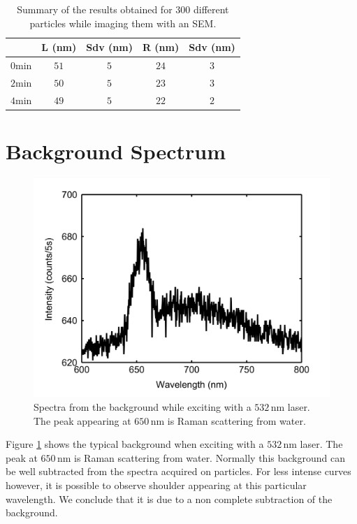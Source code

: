 \documentclass[a4paper,oneside,onecolumn]{article}
\newcommand{\nm}{\ensuremath{\,\textrm{nm}}}
\begin{document}
\begin{table}[htp]
\begin{tabular*}{0.48\textwidth}{c c c c c}
 $\,$ & L (nm) & Sdv (nm) & R (nm) & Sdv (nm) \\\hline
 $0\textrm{min}$ & $51$ & $5$ & $24$ & $3$ \\ 
 $2\textrm{min}$ & $50$ & $5$ & $23$ & $3$ \\
 $4\textrm{min}$ & $49$ & $5$ & $22$ & $2$ \\
\end{tabular*}
\label{tab:SEM_results}
\caption{Summary of the results obtained for 300 different particles while
imaging them with an SEM.}
\end{table}

\section{Background Spectrum}
\begin{figure}[tp]
 \centering
 \includegraphics[width=0.95\linewidth]{Figures/04_Supporting/03_Background/background.png}
 \caption{Spectra from the background while exciting with a $532\nm$ laser. The
 peak appearing at $650\nm$ is Raman scattering from water.}
 \label{fig:Background}
\end{figure}

Figure \ref{fig:Background} shows the typical background when exciting with a
$532\nm$ laser. The peak at $650\nm$ is Raman scattering from water. Normally
this background can be well subtracted from the spectra acquired on particles.
For less intense curves however, it is possible to observe shoulder appearing
at this particular wavelength. We conclude that it is due to a non complete
subtraction of the background. 
\end{document}
